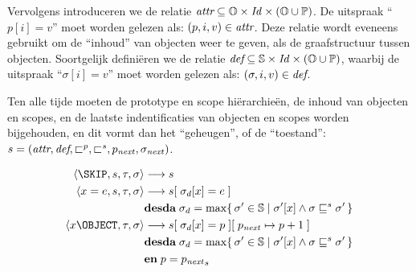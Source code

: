Vervolgens introduceren we de relatie $\textit{attr} \subseteq \mathbb{O} \times \mathit{Id} \times (\mathbb{O} \cup \mathbb{P})$. De uitspraak ``$p[i] = v$'' moet worden gelezen als: $(p, i, v) \in \textit{attr}$. Deze relatie wordt eveneens gebruikt om de ``inhoud'' van objecten weer te geven, als de graafstructuur tussen objecten. Soortgelijk definiëren we de relatie $\textit{def} \subseteq \mathbb{S} \times \mathit{Id} \times (\mathbb{O} \cup \mathbb{P})$, waarbij de uitspraak ``$\sigma[i] = v$'' moet worden gelezen als: $(\sigma, i, v) \in \textit{def}$.

Ten alle tijde moeten de prototype en scope hiërarchieën, de inhoud van objecten en scopes, en de laatste indentificaties van objecten en scopes worden bijgehouden, en dit vormt dan het ``geheugen'', of de ``toestand'': $s = (\textit{attr}, \textit{def}, \sqsubset^p, \sqsubset^s, p_\mathit{next}, \sigma_\mathit{next})$.

\begin{align*}
	\left<\SKIP, s, \tau, \sigma\right> &\longrightarrow s \\
	\left<x = e, s, \tau, \sigma\right> &\longrightarrow s[\; \sigma_d[x] = e \;] \\
	& \textbf{desda}\; \sigma_d = \max \{\, \sigma' \in \mathbb{S} \mid \sigma'[x] \land \sigma \OuterEq \sigma' \,\} \\
	\left<x \OBJECT, \tau, \sigma\right> &\longrightarrow s[\; \sigma_d[x] = p \;][\; p_\mathit{next} \mapsto p + 1 \;] \\
	& \textbf{desda}\; \sigma_d = \max \{\, \sigma' \in \mathbb{S} \mid \sigma'[x] \land \sigma \OuterEq \sigma' \,\} \\
	& \textbf{en}\; p = {p_\mathit{next}}_s
\end{align*}
